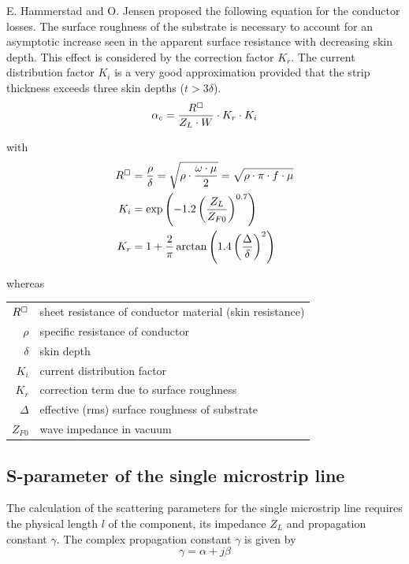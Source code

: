 \documentclass[10pt]{report}
\begin{document}
E. Hammerstad and O. Jensen \cite{Hammerstad} proposed the following
equation for the conductor losses.  The surface roughness of the
substrate is necessary to account for an asymptotic increase seen in
the apparent surface resistance with decreasing skin depth.  This
effect is considered by the correction factor $K_r$.  The current
distribution factor $K_i$ is a very good approximation provided that
the strip thickness exceeds three skin depths ($t > 3\delta$).
\begin{equation}
\alpha_c = \dfrac{R^{\boxempty}}{Z_L \cdot W}\cdot K_r \cdot K_i
\end{equation}

with
\begin{align}
R^{\boxempty} &= \dfrac{\rho}{\delta} = \sqrt{\rho\cdot\dfrac{\omega \cdot \mu}{2}} = \sqrt{\rho\cdot\pi\cdot f \cdot \mu}\\
K_i &= \exp{\left(-1.2\left(\dfrac{Z_L}{Z_{F0}}\right)^{0.7}\right)}\\
K_r &= 1 + \dfrac{2}{\pi}\arctan{\left(1.4\left(\dfrac{\Delta}{\delta}\right)^2\right)}
\end{align}

whereas

\addvspace{12pt}

\begin{tabular}{rl}
$R^{\boxempty}$& sheet resistance of conductor material (skin resistance)\\
$\rho$& specific resistance of conductor\\
$\delta$& skin depth\\
$K_i$& current distribution factor\\
$K_r$& correction term due to surface roughness\\
$\Delta$& effective (rms) surface roughness of substrate\\
$Z_{F0}$& wave impedance in vacuum
\end{tabular}

\subsection{S-parameter of the single microstrip line}

The calculation of the scattering parameters for the single microstrip
line requires the physical length $l$ of the component, its impedance
$Z_L$ and propagation constant $\gamma$.  The complex propagation
constant $\gamma$ is given by
\begin{equation}
\gamma = \alpha + j\beta
\end{equation}
\end{document}
